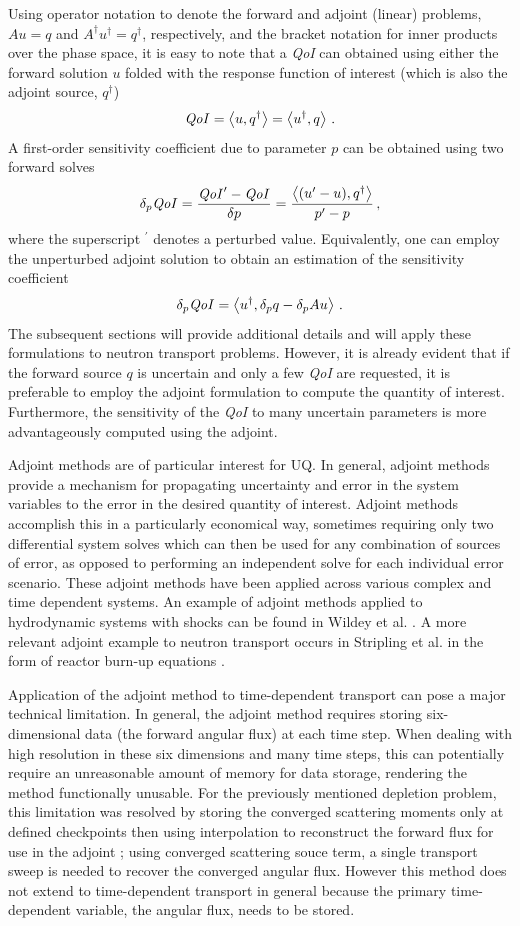 \documentclass[12pt]{report}
\newcommand{\bra}{\left\langle}
\newcommand{\ket}{\right\rangle}
\newcommand{\qoi}{{\it QoI}\xspace}
\begin{document}
Using operator notation to denote the forward and adjoint (linear) problems, $Au=q$ and $A^\dag u^\dag = q^\dag$, respectively, and the bracket notation for inner products over the phase space, it is easy to note that a \qoi can 
obtained using either the forward solution $u$ folded with the response function of interest (which is also the adjoint source, $q^\dag$)
\[
\qoi = \bra u, q^\dag \ket = \bra u^\dag, q \ket \,.
\]
A first-order sensitivity coefficient due to parameter $p$ can be obtained using two forward solves
\[
\delta_p \qoi = \frac{\qoi^\prime - \qoi}{\delta p} = \frac{ \bra (u^\prime - u), q^\dag \ket}{p^\prime - p}  \,,
\]
where the superscript $^\prime$ denotes a perturbed value. Equivalently, one can employ the unperturbed adjoint solution to obtain
an estimation of the sensitivity coefficient
\[
\delta_p \qoi = \bra u^\dag, \delta_p q - \delta_p A u \ket \,.
\]
The subsequent sections will provide additional details and will apply these formulations to neutron transport problems. However, it is already evident that if the forward source $q$ is uncertain and only a few \qoi are requested, it is preferable to employ the adjoint formulation to compute the quantity of interest. Furthermore, the sensitivity of the
\qoi to many uncertain parameters is more advantageously computed using the adjoint.


Adjoint methods are of particular interest for UQ. In general, adjoint methods provide a mechanism for propagating uncertainty and error in the system variables to the error in the desired quantity of interest. Adjoint methods accomplish this in a particularly economical way, sometimes requiring only two differential system solves which can then be used for any combination of sources of error, as opposed to performing an independent solve for each individual error scenario. These adjoint methods have been applied across various complex and time dependent systems. An example of adjoint methods applied to hydrodynamic systems with shocks can be found in Wildey et al. \cite{Wildey}. A more relevant adjoint example to neutron transport occurs in Stripling et al. in the form of reactor burn-up equations \cite{Stripling}.


Application of the adjoint method to time-dependent transport can pose a major technical limitation. In general, the adjoint method requires storing six-dimensional data (the forward angular flux) at each time step. When dealing with high resolution in these six dimensions and many time steps, this can potentially require an unreasonable amount of memory for data storage, rendering the method functionally unusable. For the previously mentioned depletion problem, this limitation was resolved by storing the converged scattering moments only at defined checkpoints then using interpolation to reconstruct the forward flux for use in the adjoint \cite{Stripling};
using converged scattering souce term, a single transport sweep is needed to recover the converged
angular flux. However this method does not extend to time-dependent transport in general because
the primary time-dependent variable, the angular flux, needs to be stored. 
\end{document}
